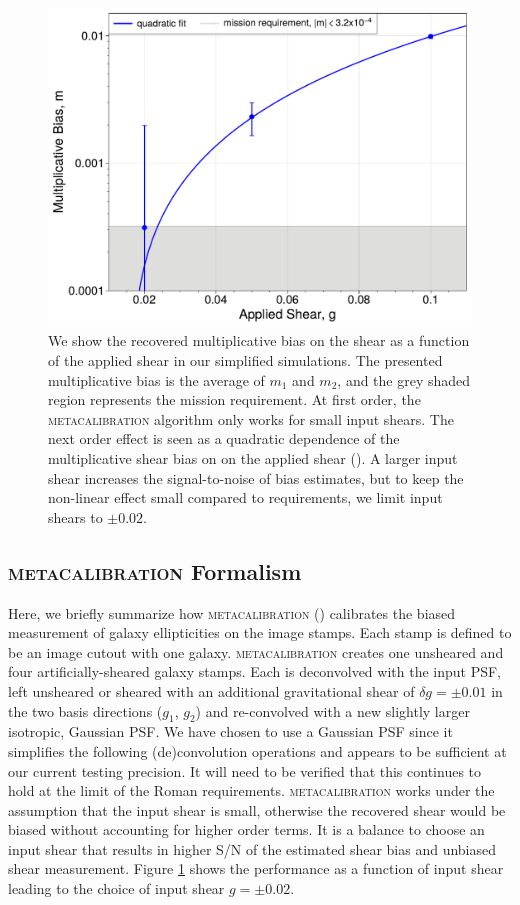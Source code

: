 \documentclass[fleqn,usenatbib]{mnras}
\begin{document}
\begin{figure}
	\includegraphics[width=\columnwidth]{metacal_bias_shear_pplt.pdf}
    \caption{We show the recovered multiplicative bias on the shear as a function of the applied shear in our simplified simulations. The presented multiplicative bias is the average of $m_{1}$ and $m_{2}$, and the grey shaded region represents the mission requirement. At first order, the \textsc{metacalibration} algorithm only works for small input shears. The next order effect is seen as a quadratic dependence of the multiplicative shear bias on on the applied shear (\citealt{2017ApJ...841...24S}). A larger input shear increases the signal-to-noise of bias estimates, but to keep the non-linear effect small compared to requirements, we limit input shears to $\pm 0.02$. }
    \label{fig:metacal_shear_linear}
\end{figure}

\subsection{\textsc{metacalibration} Formalism}
Here, we briefly summarize how \textsc{metacalibration} (\citealt{2017arXiv170202600H, 2017ApJ...841...24S}) calibrates the biased measurement of galaxy ellipticities on the image stamps. Each stamp is defined to be an image cutout with one galaxy. \textsc{metacalibration} creates one unsheared and four artificially-sheared galaxy stamps. Each is deconvolved with the input PSF, left unsheared or sheared with an additional gravitational shear of $\delta g=\pm 0.01$ in the two basis directions ($g_1$, $g_2$) and re-convolved with a new slightly larger isotropic, Gaussian PSF. We have chosen to use a Gaussian PSF since it simplifies the following (de)convolution operations and appears to be sufficient at our current testing precision. It will need to be verified that this continues to hold at the limit of the Roman requirements. \textsc{metacalibration} works under the assumption that the input shear is small, otherwise the recovered shear would be biased without accounting for higher order terms. It is a balance to choose an input shear that results in higher S/N of the estimated shear bias  and unbiased shear measurement. Figure \ref{fig:metacal_shear_linear} shows the performance as a function of input shear leading to the choice of input shear $g=\pm 0.02$. 
\end{document}
